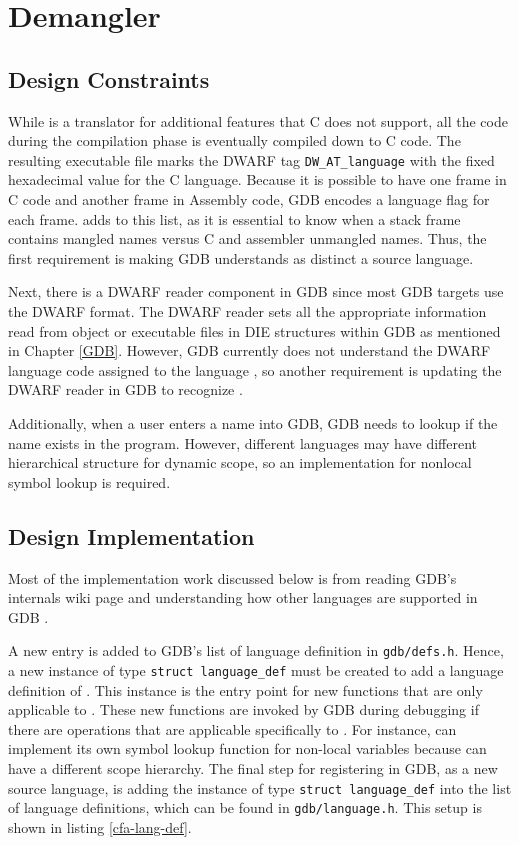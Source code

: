 \chapter{\CFAS Demangler} \label{demangler}

\section{Design Constraints}
While \CFAS is a translator for additional features that C does not support, all
the code during the compilation phase is eventually compiled down to C code.
The resulting executable file marks the DWARF tag \verb|DW_AT_language| with the
fixed hexadecimal value for the C language. Because it is possible to have one frame in C code and another
frame in Assembly code, GDB encodes a language flag for each frame. \CFAS adds
to this list, as it is essential to know when a stack frame contains mangled
names versus C and assembler unmangled names. Thus, the first requirement is
making GDB understands \CFAS as distinct a source language.

Next, there is a DWARF reader component in GDB since most GDB targets use the DWARF
format. The DWARF reader sets all the appropriate information read from object or
executable files in DIE structures within GDB as mentioned in Chapter
\ref{GDB}. However, GDB currently does not understand the DWARF language code
assigned to the
language \CFA, so another requirement is updating the DWARF reader in GDB to
recognize \CFA.

Additionally, when a user enters a name into GDB, GDB needs to lookup if the
name exists in the program. However, different languages may have different
hierarchical structure for dynamic scope, so an implementation for nonlocal
symbol lookup is required.

\section{Design Implementation}
Most of the implementation work discussed below is from reading GDB's internals
wiki page and understanding how other languages are supported in GDB \cite{reference5}.

A new entry is added to GDB's list of language definition in
\verb|gdb/defs.h|. Hence, a new instance of type \verb|struct language_def|
must be created to add a language definition of \CFAS. This instance is the
entry point for new functions that are only applicable to \CFA. These new
functions are invoked by GDB during debugging if there are operations that
are applicable specifically to \CFA. For instance, \CFAS can implement its
own symbol lookup function for non-local variables because \CFAS can have a
different scope hierarchy. The final step for registering \CFAS in GDB, as a new
source language, is adding the instance of type \verb|struct language_def| into
the list of language definitions, which can be found in
\verb|gdb/language.h|. This setup is shown in listing \ref{cfa-lang-def}.

